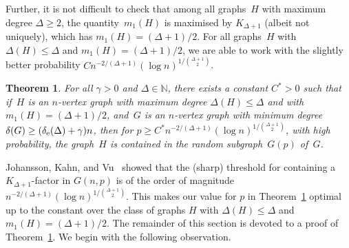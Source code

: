 \documentclass[final]{article}
\newtheorem{theorem}{Theorem}[section]
\theoremstyle{definition}
\newcommand{\exth}{\delta_{\rm e}(\Delta)}
\begin{document}
Further, it is not difficult to check that among all graphs~$H$ with maximum
degree $\Delta\ge2$, the quantity~$m_1(H)$ is maximised by
$K_{\Delta+1}$ (albeit not uniquely), which has
$m_1(H)=(\Delta+1)/{2}$. For all graphs~$H$ with
$\Delta(H) \leq \Delta$ and $m_1(H)={(\Delta+1)}/{2}$, we are able to work with the slightly better
probability $Cn^{-2/(\Delta+1)}(\log n)^{1/\binom{\Delta+1}{2}}$.

\begin{theorem}
    \label{thm:tight_improvement}
    For all\/ $\gamma > 0$ and\/ $\Delta \in \mathbb{N}$, there exists
    a constant\/ $C^* > 0$ such that if~$H$ is an $n$-vertex graph
    with maximum degree\/ $\Delta(H) \leq \Delta$ and with $m_1(H) = (\Delta+1)/2$, and~$G$ is an\/
    $n$-vertex graph with minimum degree\/
    $\delta(G) \geq (\exth+ \gamma) n$, then for\/
    $p \geq C^*n^{-2/(\Delta+1)}(\log n)^{1/\binom{\Delta+1}{2}}$, with high probability, the graph~$H$ is contained in the random subgraph~$G(p)$ of~$G$.
\end{theorem}

Johansson, Kahn, and Vu~\cite{K_rfactor_threshold} showed that the (sharp) threshold for containing a $K_{\Delta+1}$-factor in $G(n,p)$ is of the order of magnitude $n^{-2/(\Delta+1)}(\log n)^{1/\binom{\Delta+1}{2}}$. This makes our value for $p$ in Theorem~\ref{thm:tight_improvement} optimal up to the
constant over the class of graphs $H$ with $\Delta(H) \leq \Delta$ and $m_1(H) = (\Delta+1)/2$. The remainder of this section is devoted to a proof of Theorem~\ref{thm:tight_improvement}. We begin with the following observation.
\end{document}
